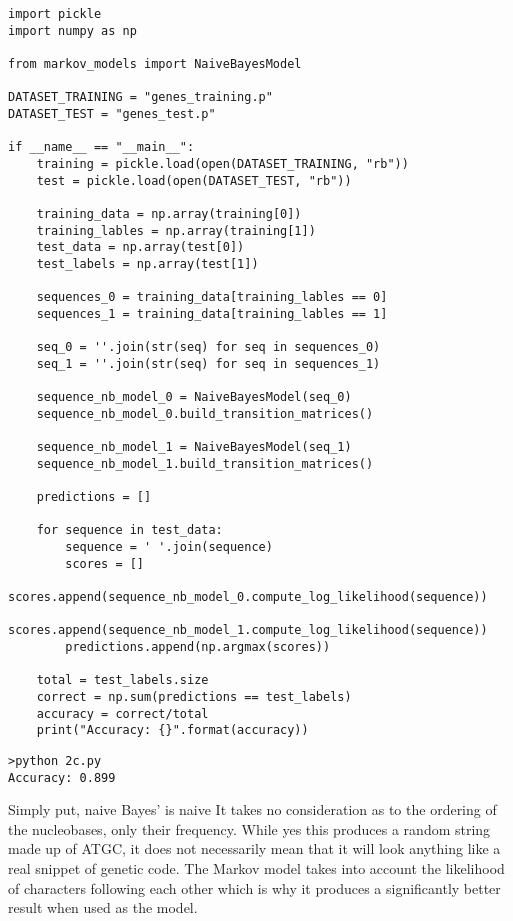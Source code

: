 \documentclass[12pt]{article}
\begin{document}
\begin{flushleft}
		\begin{lstlisting}
import pickle
import numpy as np 

from markov_models import NaiveBayesModel

DATASET_TRAINING = "genes_training.p"
DATASET_TEST = "genes_test.p"

if __name__ == "__main__":
	training = pickle.load(open(DATASET_TRAINING, "rb"))
	test = pickle.load(open(DATASET_TEST, "rb"))
	
	training_data = np.array(training[0])
	training_lables = np.array(training[1])
	test_data = np.array(test[0])
	test_labels = np.array(test[1])
	
	sequences_0 = training_data[training_lables == 0]
	sequences_1 = training_data[training_lables == 1]
	
	seq_0 = ''.join(str(seq) for seq in sequences_0)
	seq_1 = ''.join(str(seq) for seq in sequences_1)
	
	sequence_nb_model_0 = NaiveBayesModel(seq_0)
	sequence_nb_model_0.build_transition_matrices()
	
	sequence_nb_model_1 = NaiveBayesModel(seq_1)
	sequence_nb_model_1.build_transition_matrices()
	
	predictions = []
	
	for sequence in test_data:
		sequence = ' '.join(sequence)
		scores = []
		scores.append(sequence_nb_model_0.compute_log_likelihood(sequence))
		scores.append(sequence_nb_model_1.compute_log_likelihood(sequence))
		predictions.append(np.argmax(scores))
	
	total = test_labels.size
	correct = np.sum(predictions == test_labels)
	accuracy = correct/total
	print("Accuracy: {}".format(accuracy))

		\end{lstlisting}
		
		\begin{lstlisting}
>python 2c.py
Accuracy: 0.899
		\end{lstlisting}
		
		Simply put, naive Bayes' is naive It takes no consideration as to the ordering of the nucleobases, only their frequency. While yes this produces a random string made up of ATGC, it does not necessarily mean that it will look anything like a real snippet of genetic code. The Markov model takes into account the likelihood of characters following each other which is why it produces a significantly better result when used as the model.\\

	\end{flushleft}
\end{document}
